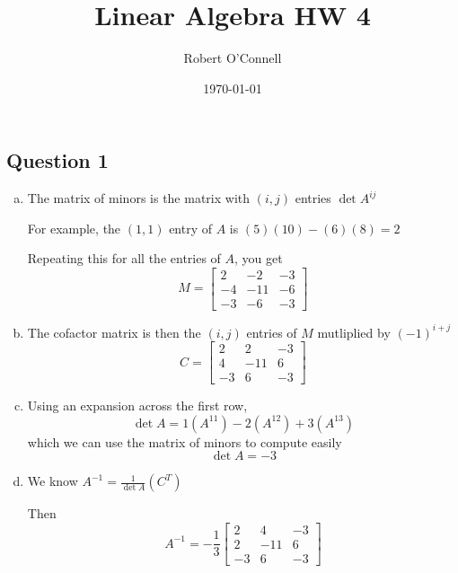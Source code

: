 \documentclass{article}
\title{\textbf{Linear Algebra HW 4}}
\author{Robert O'Connell}
\date{\today}
\begin{document}
\maketitle

\subsection*{Question 1}
\begin{enumerate}[(a)]
    \item The matrix of minors is the matrix with \((i,j)\) entries \(\det{A^{ij}}\)
    
    For example, the \((1,1)\) entry of \(A\) is \((5)(10)-(6)(8) = 2\)

    Repeating this for all the entries of \(A\), you get
    \[ M = 
    \begin{bmatrix}
        2&-2&-3 \\
        -4&-11&-6 \\
        -3&-6&-3
    \end{bmatrix}
    \]

    \item The cofactor matrix is then the \((i,j)\) entries of \(M\) mutliplied
    by \((-1)^{i+j}\)
    \[ C = 
    \begin{bmatrix}
        2&2&-3 \\
        4&-11&6 \\
        -3&6&-3 
    \end{bmatrix}
    \]

    \item Using an expansion across the first row, 
    \[
    \det{A} = 1(A^{11}) - 2(A^{12}) + 3(A^{13})
    \]
    which we can use the matrix of minors to compute easily
    \[
    \det{A} = -3
    \]

    \item We know \(A^{-1} = \frac{1}{\det{A}}(C^T)\)
    
    Then 
    \[
    A^{-1} = -\frac{1}{3}\begin{bmatrix}
        2&4&-3 \\
        2&-11&6 \\
        -3&6&-3
    \end{bmatrix}
    \]


\end{enumerate}
\end{document}
